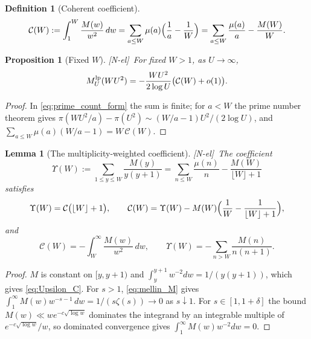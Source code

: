 \documentclass[11pt]{amsart}
\numberwithin{equation}{section}
\theoremstyle{plain}
\newtheorem{proposition}[theorem]{Proposition}
\newtheorem{lemma}[theorem]{Lemma}
\theoremstyle{definition}
\newtheorem{definition}[theorem]{Definition}
\theoremstyle{remark}
\newcommand{\Cc}{\mathcal{C}}
\newcommand{\tagNE}{\textup{[N-el]}}
\begin{document}
\begin{definition}[Coherent coefficient]
\label{def:coherent_coefficient}
\begin{equation}
\label{eq:C_def}
  \Cc(W):=\int_1^W\frac{M(w)}{w^2}\,dw
  =\sum_{a\le W}\mu(a)\Bigl(\frac1a-\frac1W\Bigr)
  =\sum_{a\le W}\frac{\mu(a)}a-\frac{M(W)}W .
\end{equation}
\end{definition}

\begin{proposition}[Fixed $W$]
\label{prop:fixed-scale}
\tagNE\ For fixed $W>1$, as $U\to\infty$,
\begin{equation}
\label{eq:E_fixed_W}
  M^{\rm lp}_U(WU^2)=-\frac{WU^2}{2\log U}\bigl(\Cc(W)+o(1)\bigr).
\end{equation}
\end{proposition}

\begin{proof}
In \eqref{eq:prime_count_form} the sum is finite; for $a<W$ the prime number
theorem gives $\pi(WU^2/a)-\pi(U^2)\sim(W/a-1)U^2/(2\log U)$, and
$\sum_{a\le W}\mu(a)(W/a-1)=W\,\Cc(W)$.
\end{proof}

\begin{lemma}[The multiplicity-weighted coefficient]
\label{lem:copy-weight-coefficient}
\tagNE\ The coefficient
\begin{equation}
\label{eq:Upsilon_def}
  \Upsilon(W):=\sum_{1\le y\le W}\frac{M(y)}{y(y+1)}
  =\sum_{n\le W}\frac{\mu(n)}n-\frac{M(W)}{\lfloor W\rfloor+1}
\end{equation}
satisfies
\begin{equation}
\label{eq:Upsilon_C}
  \Upsilon(W)=\Cc\bigl(\lfloor W\rfloor+1\bigr),\qquad
  \Cc(W)=\Upsilon(W)-M(W)\Bigl(\frac1W-\frac1{\lfloor W\rfloor+1}\Bigr),
\end{equation}
and
\begin{equation}
\label{eq:C_tail}
  \Cc(W)=-\int_W^\infty\frac{M(w)}{w^2}\,dw,\qquad
  \Upsilon(W)=-\sum_{n>W}\frac{M(n)}{n(n+1)}.
\end{equation}
\end{lemma}

\begin{proof}
$M$ is constant on $[y,y+1)$ and $\int_y^{y+1}w^{-2}dw=1/(y(y+1))$, which
gives \eqref{eq:Upsilon_C}. For $s>1$, \eqref{eq:mellin_M} gives
$\int_1^\infty M(w)w^{-s-1}\,dw=1/(s\zeta(s))\to0$ as $s\downarrow1$. For
$s\in[1,1+\delta]$ the bound $M(w)\ll we^{-c\sqrt{\log w}}$ dominates the
integrand by an integrable multiple of $e^{-c\sqrt{\log w}}/w$, so dominated
convergence gives $\int_1^\infty M(w)w^{-2}dw=0$.
\end{proof}
\end{document}
